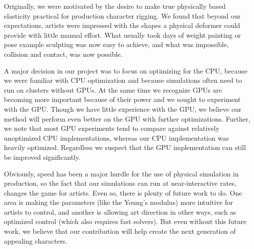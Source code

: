 
Originally, we were motivated by the desire to make true physically based
elasticity practical for production character rigging. We found that beyond our
expectations, artists were impressed with the shapes a physical deformer could
provide with little manual effort. What usually took days of weight
painting or pose example sculpting was now easy to achieve, and what was
impossible, collision and contact, was now possible.

A major decision in our project was to focus on optimizing for the CPU,
because we were familiar with CPU optimization and because
simulations often need to run on clusters without GPUs.  At the same
time we recognize GPUs are becoming more important because of their power and we
sought to experiment with the GPU. Though we have little experience with the
GPU, we believe our method will perform even better on the GPU with further
optimizations. Further, we note that most GPU experiments tend to compare
against relatively unoptimized CPU implementations, whereas our CPU
implementation was heavily optimized. Regardless we suspect that the GPU
implementation can still be improved significantly. 

Obviously, speed has been a major hurdle for the use of physical simulation in
production, so the fact that our simulations can run at near-interactive rates,
changes the game for artists. Even so, there is plenty of future work to do. One
area is making the parameters (like the Young's modulus) more intuitive for
artists to control, and another is allowing art direction in other ways, such as optimized
control (which also requires fast solvers). But even without this future work, we
believe that our contribution will help create the next generation of appealing
characters. 

